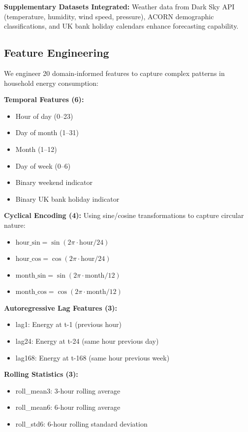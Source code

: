 \documentclass[11pt, a4paper, oneside]{article}
\begin{document}
\textbf{Supplementary Datasets Integrated:}
Weather data from Dark Sky API (temperature, humidity, wind speed, pressure), ACORN demographic classifications, and UK bank holiday calendars enhance forecasting capability.

\subsection{Feature Engineering}

We engineer 20 domain-informed features to capture complex patterns in household energy consumption:

\textbf{Temporal Features (6):}
\begin{itemize}
    \item Hour of day (0--23)
    \item Day of month (1--31)
    \item Month (1--12)
    \item Day of week (0--6)
    \item Binary weekend indicator
    \item Binary UK bank holiday indicator
\end{itemize}

\textbf{Cyclical Encoding (4):}
Using sine/cosine transformations to capture circular nature:
\begin{itemize}
    \item $\text{hour\_sin} = \sin(2\pi \cdot \text{hour} / 24)$
    \item $\text{hour\_cos} = \cos(2\pi \cdot \text{hour} / 24)$
    \item $\text{month\_sin} = \sin(2\pi \cdot \text{month} / 12)$
    \item $\text{month\_cos} = \cos(2\pi \cdot \text{month} / 12)$
\end{itemize}

\textbf{Autoregressive Lag Features (3):}
\begin{itemize}
    \item lag1: Energy at t-1 (previous hour)
    \item lag24: Energy at t-24 (same hour previous day)
    \item lag168: Energy at t-168 (same hour previous week)
\end{itemize}

\textbf{Rolling Statistics (3):}
\begin{itemize}
    \item roll\_mean3: 3-hour rolling average
    \item roll\_mean6: 6-hour rolling average
    \item roll\_std6: 6-hour rolling standard deviation
\end{itemize}
\end{document}
